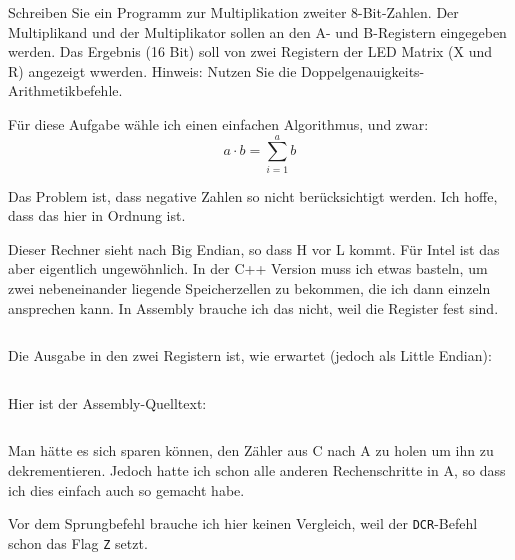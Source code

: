 \begin{problem}
	Schreiben Sie ein Programm zur Multiplikation zweiter 8-Bit-Zahlen. Der
	Multiplikand und der Multiplikator sollen an den A- und B-Registern
	eingegeben werden. Das Ergebnis (16 Bit) soll von zwei Registern der LED
	Matrix (X und R) angezeigt wwerden. Hinweis: Nutzen Sie die
	Doppelgenauigkeits-Arithmetikbefehle.
\end{problem}

Für diese Aufgabe wähle ich einen einfachen Algorithmus, und zwar:
\[
	a \cdot b = \sum_{i = 1}^{a} b
\]

Das Problem ist, dass negative Zahlen so nicht berücksichtigt werden. Ich
hoffe, dass das hier in Ordnung ist.

Dieser Rechner sieht nach Big Endian, so dass H vor L kommt. Für Intel ist das
aber eigentlich ungewöhnlich. In der C++ Version muss ich etwas basteln, um
zwei nebeneinander liegende Speicherzellen zu bekommen, die ich dann einzeln
ansprechen kann. In Assembly brauche ich das nicht, weil die Register fest
sind.

\inputminted[fontsize=\small, linenos]{cpp}{../Prototypen/g.cpp}

Die Ausgabe in den zwei Registern ist, wie erwartet (jedoch als Little Endian):

\begin{multicols}{3}
	\inputminted[fontsize=\footnotesize]{text}{g.txt}
\end{multicols}

Hier ist der Assembly-Quelltext:

\inputminted[fontsize=\small, linenos]{python}{../Assembly/g.s}

Man hätte es sich sparen können, den Zähler aus C nach A zu holen um ihn zu
dekrementieren. Jedoch hatte ich schon alle anderen Rechenschritte in A, so
dass ich dies einfach auch so gemacht habe.

Vor dem Sprungbefehl brauche ich hier keinen Vergleich, weil der
\texttt{DCR}-Befehl schon das Flag \texttt Z setzt.


\FloatBarrier
\IfFileExists{\bibliographyfile}{
	
}{}



